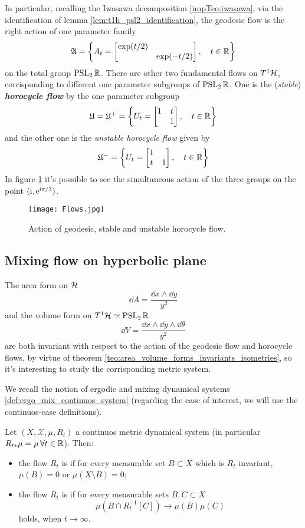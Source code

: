 In particular, recalling the Iwasawa decomposition \ref{impTeo:iwasawa}, via the identification of lemma \ref{lem:t1h_psl2_identification}, the geodesic flow is the right action of one parameter family 
\[
\mathfrak{A}=\left\{A_{t}=
\begin{bmatrix} \exp(t/2)&\\&\exp(-t/2) \end{bmatrix},\quad t\in\mathbb{R}
\right\}
\]
on the total group $\operatorname{PSL}_{2}\mathbb{R}$. There are other two fundamental flows on $T^{1}\mathcal{H}$, corrisponding to different one parameter subgroups of $\operatorname{PSL}_{2}\mathbb{R}$. One is the (\emph{stable}) \emph{\textbf{horocycle flow}} by the one parameter subgroup
\[
\mathfrak{U}=\mathfrak{U}^{+}=\left\{
U_{t}=\begin{bmatrix} 1&t\\&1 \end{bmatrix},\quad t\in\mathbb{R}
\right\}
\]
and the other one is the \emph{unstable horocycle flow} given by 
\[
\mathfrak{U}^{-}=\left\{
U_{t}=\begin{bmatrix} 1&\\t&1 \end{bmatrix},\quad t\in\mathbb{R}
\right\}
\]
In figure \ref{fig:hyp_action_flows} it's possible to see the simultaneous action of the three groups on the point $(\mathrm{i},\mathrm{e}^{\mathrm{i}\pi/3})$.

\begin{figure}[H]
\centering
\texttt{[image: Flows.jpg]}
  \noindent\\
  \decoRule
  \caption{Action of geodesic, stable and unstable horocycle flow.}
  \label{fig:hyp_action_flows}
\end{figure}



\subsection{Mixing flow on hyperbolic plane}

\label{subsec:mixing}

The area form on $\mathcal{H}$ 
\[
\dd A=\frac{\dd x\wedge\dd y}{y^{2}}
\]
and the volume form on $T^{1}\mathcal{H}\simeq\operatorname{PSL}_{2}\mathbb{R}$
\[
\dd V=\frac{\dd x\wedge\dd y\wedge\dd\theta}{y^{2}}
\]
are both invariant with respect to the action of the geodesic flow and horocycle flows, by virtue of theorem \ref{teo:area_volume_forms_invariants_isometries}, so it's interesting to study the corrisponding metric system.

We recall the notion of ergodic and mixing dynamical systems \ref{def:ergo_mix_continuos_system} (regarding the case of interest, we will use the continuos-case definitions). 

\begin{defin}
\label{def:ergo_mix_continuos_system}
Let $(X,\mathcal{X},\mu,R_{t})$ a continuos metric dynamical system (in particular $R_{t\ast}\mu=\mu\,\forall t\in\mathbb{R}$). Then:
\begin{itemize}
\item the flow $R_{t}$ is \emph{} if for every measurable set $B\subset X$ which is $R_{t}$ invariant, $\mu(B)=0$ or $\mu(X\setminus B)=0$;
\item the flow $R_{t}$ is \emph{} if for every measurable sets $B,C\subset X$ 
\[
\mu(B\cap R_{t}^{-1}[C])\to\mu(B)\mu(C)
\]
holds, when $t\to\infty$.
\end{itemize} 
\end{defin}

